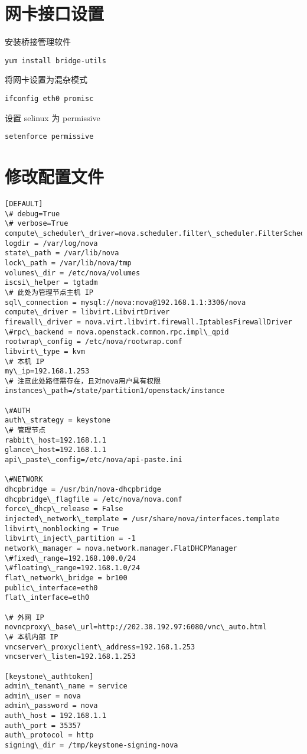 \documentclass[a4paper,12pt,english]{sphinxmanual}
\begin{document}
\section{网卡接口设置}
\label{nova_compute:id2}
安装桥接管理软件

\begin{Verbatim}[commandchars=\\\{\}]
yum install bridge-utils
\end{Verbatim}

将网卡设置为混杂模式

\begin{Verbatim}[commandchars=\\\{\}]
ifconfig eth0 promisc
\end{Verbatim}

设置 selinux 为 permissive

\begin{Verbatim}[commandchars=\\\{\}]
setenforce permissive
\end{Verbatim}


\section{修改配置文件}
\label{nova_compute:id3}
\begin{Verbatim}[commandchars=\\\{\}]
[DEFAULT]
\# debug=True
\# verbose=True
compute\_scheduler\_driver=nova.scheduler.filter\_scheduler.FilterScheduler
logdir = /var/log/nova
state\_path = /var/lib/nova
lock\_path = /var/lib/nova/tmp
volumes\_dir = /etc/nova/volumes
iscsi\_helper = tgtadm
\# 此处为管理节点主机 IP
sql\_connection = mysql://nova:nova@192.168.1.1:3306/nova
compute\_driver = libvirt.LibvirtDriver
firewall\_driver = nova.virt.libvirt.firewall.IptablesFirewallDriver
\#rpc\_backend = nova.openstack.common.rpc.impl\_qpid
rootwrap\_config = /etc/nova/rootwrap.conf
libvirt\_type = kvm
\# 本机 IP
my\_ip=192.168.1.253
\# 注意此处路径需存在，且对nova用户具有权限
instances\_path=/state/partition1/openstack/instance

\#AUTH
auth\_strategy = keystone
\# 管理节点
rabbit\_host=192.168.1.1
glance\_host=192.168.1.1
api\_paste\_config=/etc/nova/api-paste.ini

\#NETWORK
dhcpbridge = /usr/bin/nova-dhcpbridge
dhcpbridge\_flagfile = /etc/nova/nova.conf
force\_dhcp\_release = False
injected\_network\_template = /usr/share/nova/interfaces.template
libvirt\_nonblocking = True
libvirt\_inject\_partition = -1
network\_manager = nova.network.manager.FlatDHCPManager
\#fixed\_range=192.168.100.0/24
\#floating\_range=192.168.1.0/24
flat\_network\_bridge = br100
public\_interface=eth0
flat\_interface=eth0

\# 外网 IP
novncproxy\_base\_url=http://202.38.192.97:6080/vnc\_auto.html
\# 本机内部 IP
vncserver\_proxyclient\_address=192.168.1.253
vncserver\_listen=192.168.1.253

[keystone\_authtoken]
admin\_tenant\_name = service
admin\_user = nova
admin\_password = nova
auth\_host = 192.168.1.1
auth\_port = 35357
auth\_protocol = http
signing\_dir = /tmp/keystone-signing-nova
\end{Verbatim}
\end{document}
